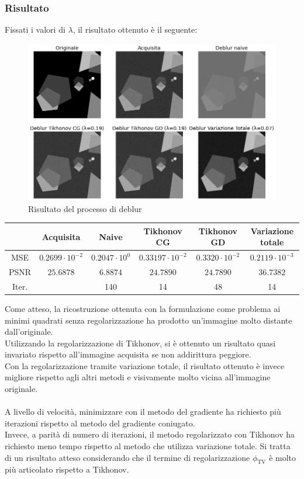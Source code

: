 \documentclass[11pt]{article}
\begin{document}
\subsubsection{Risultato}
Fissati i valori di $\lambda$, il risultato ottenuto è il seguente:\\
\begin{figure}[H]
    \centering
    \includegraphics[width=15cm]{esecuzione/1/deblur.png}
    \caption{Risultato del processo di deblur}
    \label{fig:deblur1}
\end{figure}

\begin{center}
    \begin{tabular}{ |c|c|c|c|c|c| }
    \hline
    & Acquisita & Naive & Tikhonov CG & Tikhonov GD & Variazione totale \\ 
    \hline
    MSE & $0.2699 \cdot 10^{-2}$ & $0.2047 \cdot 10^{0}$ & $0.33197 \cdot 10^{-2}$ & $0.3320 \cdot 10^{-2}$ & $0.2119 \cdot 10^{-3}$ \\ 
    PSNR & $25.6878$ & $6.8874$ & $24.7890$ & $24.7890$ & $36.7382$ \\ 
    Iter. & & 140 & 14 & 48 & 14 \\ 
    \hline
    \end{tabular}
\end{center}

Come atteso, la ricostruzione ottenuta con la formulazione come problema ai minimi quadrati senza regolarizzazione ha prodotto un'immagine molto distante dall'originale.\\
Utilizzando la regolarizzazione di Tikhonov, si è ottenuto un risultato quasi invariato rispetto all'immagine acquisita se non addirittura peggiore.\\
Con la regolarizzazione tramite variazione totale, il risultato ottenuto è invece migliore rispetto agli altri metodi e visivamente molto vicina all'immagine originale.\\~\\
A livello di velocità, minimizzare con il metodo del gradiente ha richiesto più iterazioni rispetto al metodo del gradiente coniugato. \\
Invece, a parità di numero di iterazioni, il metodo regolarizzato con Tikhonov ha richiesto meno tempo rispetto al metodo che utilizza variazione totale. Si tratta di un risultato atteso considerando che il termine di regolarizzazione $\phi_{\text{TV}}$ è molto più articolato rispetto a Tikhonov.
\end{document}
